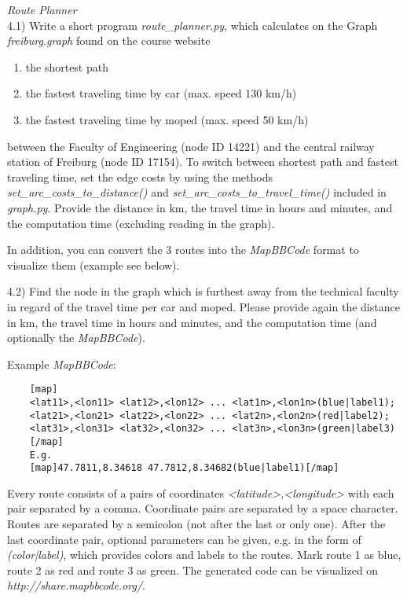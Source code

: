   \textit{Route Planner}\\
4.1) Write a short program \textit{route\_planner.py}, which calculates on the Graph \emph{freiburg.graph} found on the course website
\begin{enumerate} \itemsep-2pt
	\item the shortest path
	\item the fastest traveling time by car (max. speed 130 km/h)
	\item the fastest traveling time by moped (max. speed 50 km/h)
\end{enumerate}
between the Faculty of Engineering (node ID 14221) and the central railway station of Freiburg (node ID 17154).
To switch between shortest path and fastest traveling time, set the edge costs by using the methods \emph{set\_arc\_costs\_to\_distance()} and \emph{set\_arc\_costs\_to\_travel\_time()} included in \emph{graph.py}.
Provide the distance in km, the travel time in hours and minutes, and the computation time (excluding reading in the graph).

In addition, you can convert the 3 routes into the \emph{MapBBCode} format to visualize them (example see below).

4.2) Find the node in the graph which is furthest away from the technical
faculty in regard of the travel time per car and moped. Please provide
again the distance in km, the travel time in hours and minutes, and the computation
time (and optionally the \emph{MapBBCode}).

Example \emph{MapBBCode}:
{\small
	\begin{verbatim}
	[map]
	<lat11>,<lon11> <lat12>,<lon12> ... <lat1n>,<lon1n>(blue|label1);
	<lat21>,<lon21> <lat22>,<lon22> ... <lat2n>,<lon2n>(red|label2);
	<lat31>,<lon31> <lat32>,<lon32> ... <lat3n>,<lon3n>(green|label3)
	[/map]
	E.g.
	[map]47.7811,8.34618 47.7812,8.34682(blue|label1)[/map]
\end{verbatim}}

Every route consists of a pairs of coordinates \emph{<latitude>,<longitude>}
with each pair separated by a comma.
Coordinate pairs are separated by a space character. Routes are separated by
a semicolon (not after the last or only one).
After the last coordinate pair, optional parameters can be given, e.g. in the form of \emph{(color|label)}, which provides colors and labels to the routes.
Mark route 1 as blue, route 2 as red and route 3 as green.
The generated code can be visualized on \emph{http://share.mapbbcode.org/}.
